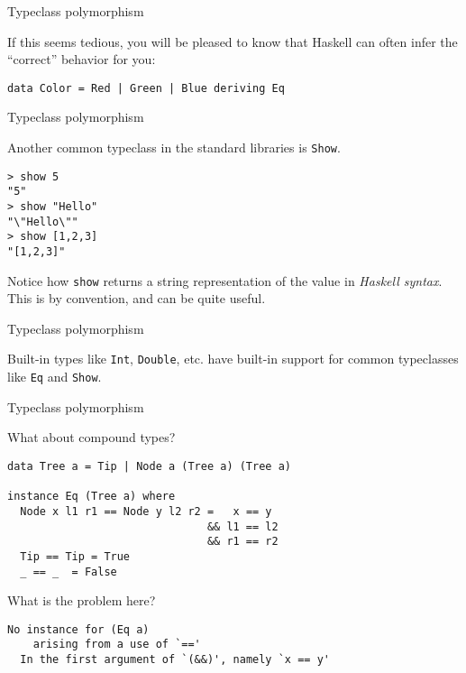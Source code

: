 %
\begin{frame}[fragile]{Typeclass polymorphism}

If this seems tedious, you will be pleased to know that Haskell can often infer
the ``correct'' behavior for you:

\begin{block}{}
\begin{verbatim}
data Color = Red | Green | Blue deriving Eq
\end{verbatim}
\end{block}

\end{frame}

%
\begin{frame}[fragile]{Typeclass polymorphism}

Another common typeclass in the standard libraries is \texttt{Show}.

\begin{block}{}
\begin{verbatim}
> show 5
"5"
> show "Hello"
"\"Hello\""
> show [1,2,3]
"[1,2,3]"
\end{verbatim}
\end{block}

Notice how \texttt{show} returns a string representation of the value in
\emph{Haskell syntax}. This is by convention, and can be quite useful.

\end{frame}

%
\begin{frame}[fragile]{Typeclass polymorphism}

Built-in types like \texttt{Int}, \texttt{Double}, etc. have built-in support
for common typeclasses like \texttt{Eq} and \texttt{Show}.

\end{frame}

%
\begin{frame}[fragile]{Typeclass polymorphism}

What about compound types?

\begin{block}{}
\begin{verbatim}
data Tree a = Tip | Node a (Tree a) (Tree a)

instance Eq (Tree a) where
  Node x l1 r1 == Node y l2 r2 =   x == y 
                               && l1 == l2 
                               && r1 == r2
  Tip == Tip = True
  _ == _  = False
\end{verbatim}
\end{block}

What is the problem here?

\begin{block}{}
\begin{verbatim}
No instance for (Eq a)
    arising from a use of `=='
  In the first argument of `(&&)', namely `x == y'
\end{verbatim}
\end{block}

\end{frame}

